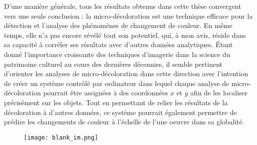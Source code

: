 D'une manière générale, tous les résultats obtenus dans cette thèse convergent vers une seule conclusion : la micro-décoloration est une technique efficace pour la détection et l'analyse des phénomènes de changement de couleur. En même temps, elle n'a pas encore révélé tout son potentiel, qui, à mon avis, réside dans sa capacité à corréler ses résultats avec d'autres données analytiques. Étant donné l'importance croissante des techniques d'imagerie dans la science du patrimoine culturel au cours des dernières décennies, il semble pertinent d'orienter les analyses de micro-décoloration dans cette direction avec l'intention de créer un système contrôlé par ordinateur dans lequel chaque analyse de micro-décoloration pourrait être assignées à des coordonnées $x$ et $y$ afin de les localiser précisément sur les objets. Tout en permettant de relier les résultats de la décoloration à d'autres données, ce système pourrait également permettre de prédire les changements de couleur à l'échelle de l'une oeuvre dans sa globalité.\\

\begin{figure}[!h]
\centering
\texttt{[image: blank\_im.png]}
\end{figure}


